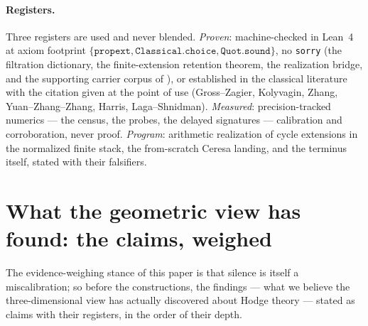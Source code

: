 \documentclass[11pt]{article}
\theoremstyle{definition}
\theoremstyle{remark}
\begin{document}
\paragraph{Registers.} Three registers are used and never blended.
\emph{Proven}: machine-checked in Lean~4 at axiom footprint
$\{\texttt{propext},\texttt{Classical.choice},\texttt{Quot.sound}\}$, no
\texttt{sorry} (the filtration dictionary, the finite-extension retention theorem, the
realization bridge, and the
supporting carrier corpus of \cite{Universal}), or established in the classical
literature with the citation given at the point of use (Gross--Zagier,
Kolyvagin, Zhang, Yuan--Zhang--Zhang, Harris, Laga--Shnidman).
\emph{Measured}: precision-tracked numerics --- the census, the probes, the
delayed signatures --- calibration and corroboration, never proof.
\emph{Program}: arithmetic realization of cycle extensions in the normalized
finite stack, the from-scratch Ceresa landing, and the terminus itself, stated with their falsifiers.

\section{What the geometric view has found: the claims, weighed}\label{sec:findings}

The evidence-weighing stance of this paper is that silence is itself a
miscalibration; so before the constructions, the findings --- what we believe
the three-dimensional view has actually discovered about Hodge theory ---
stated as claims with their registers, in the order of their depth.
\end{document}
